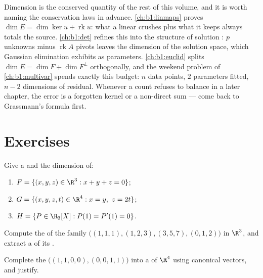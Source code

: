 \begin{remark}
\label{rem:b1:findim:perspectives}
Dimension is the conserved quantity of the rest of this volume,
and it is worth naming the conservation laws in advance.
\cref{ch:b1:linmaps} proves $\dim E = \dim\ker u +
\operatorname{rk} u$: what a linear  crushes plus what it
keeps always totals the source. \cref{ch:b1:det} refines this
into the structure of solution : $p$ unknowns minus
$\operatorname{rk} A$ pivots leaves the dimension of the
solution space, which Gaussian elimination exhibits as 
parameters. \cref{ch:b1:euclid} splits $\dim E = \dim F + \dim
F^\perp$ orthogonally, and the weekend problem of
\cref{ch:b1:multivar} spends exactly this budget: $n$ data
points, $2$ parameters fitted, $n - 2$ dimensions of residual.
Whenever a count refuses to balance in a later chapter, the
error is a forgotten kernel or a non-direct sum --- come back to
Grassmann's formula first.
\end{remark}

\section{Exercises}

\begin{exercise}[$\star$]\label{exo:b1:findim:1}
Give a  and the dimension of:
\begin{enumerate}
  \item $F = \{(x,y,z) \in \R^3 : x + y + z = 0\}$;
  \item $G = \{(x,y,z,t) \in \R^4 : x = y,\ z = 2t\}$;
  \item $H = \{P \in \R_3[X] : P(1) = P'(1) = 0\}$.
\end{enumerate}
\end{exercise}

\begin{exercise}[$\star$]\label{exo:b1:findim:2}
Compute the  of the family
$\bigl((1,1,1), (1,2,3), (3,5,7), (0,1,2)\bigr)$ in $\R^3$, and
extract a  of its .
\end{exercise}

\begin{exercise}[$\star$]\label{exo:b1:findim:3}
Complete the  $\bigl((1,1,0,0), (0,0,1,1)\bigr)$ into a
 of $\R^4$ using canonical vectors, and justify.
\end{exercise}

